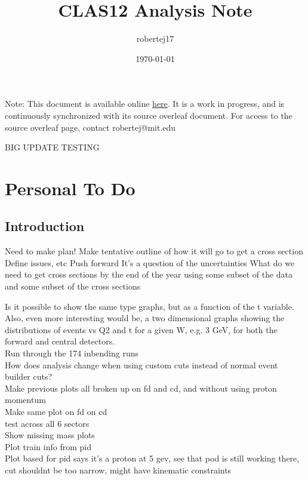 \documentclass[oneside]{book}
\title{CLAS12 \DVEP Analysis Note}
\author{robertej17 }
\date{\today}
\begin{document}
\maketitle
Note: This document is available online \href{http://www.lns.mit.edu/~robertej/CLAS12/CLAS12DVPiPAnalysisNote.pdf}{here}. It is a work in progress, and is continuously synchronized with its source overleaf document. For access to the source overleaf page, contact robertej@mit.edu

BIG UPDATE TESTING

\chapter{Personal To Do}

\section{Introduction}
Need to make plan!
Make tentative outline of how it will go to get a cross section
Define issues, etc
Push forward
It’s a question of the uncertainties 
What do we need to get cross sections by the end of the year using some subset of the data and some subset of the cross sections

Is it possible to show the same type graphs, but as a function of the t variable. Also, even more interesting would be, a two dimensional graphs  showing the distributions of events vs Q2 and t  for a given W, e.g. 3 GeV, for both the forward and central detectors.\\

Run through the 174 inbending runs\\

How does analysis change when using custom cuts instead of normal event builder cuts?\\


Make previous plots all broken up on fd and cd, and without using proton momentum\\

Make same plot on fd on cd \\
test across all 6 sectors\\
Show missing mass plots\\
Plot train info from pid\\

Plot based for pid says it's a proton at 5 gev, see that pod is still working there, cut shouldnt be too narrow, might have kinematic constraints\\
\end{document}
